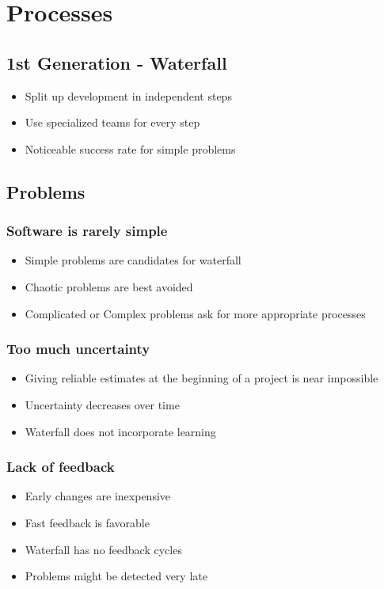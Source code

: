 \usepackage{graphicx}

\section{Processes}
\subsection{1st Generation - Waterfall}
\begin{itemize}
    \item Split up development in independent steps
    \item Use specialized teams for every step
    \item Noticeable success rate for simple problems
\end{itemize}
\subsection{Problems}
\subsubsection{Software is rarely simple}
\begin{itemize}
    \item Simple problems are candidates for waterfall
    \item Chaotic problems are best avoided
    \item Complicated or Complex problems ask for more appropriate processes
\end{itemize}
\subsubsection{Too much uncertainty}
\begin{itemize}
    \item Giving reliable estimates at the beginning of a project is near impossible
    \item Uncertainty decreases over time
    \item Waterfall does not incorporate learning
\end{itemize}
\subsubsection{Lack of feedback}
\begin{itemize}
    \item Early changes are inexpensive
    \item Fast feedback is favorable
    \item Waterfall has no feedback cycles
    \item Problems might be detected very late
\end{itemize}
